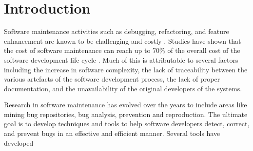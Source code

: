 
\setcounter{page}{1}

\chapter{Introduction}

Software maintenance activities such as debugging, refactoring, and feature enhancement are known to be challenging and costly \cite{Pressman2005}.
Studies have shown that the cost of software maintenance can reach up to 70\% of the overall cost of the software development life cycle \cite{HealthSocial2002}.
Much of this is attributable to several factors including the increase in software complexity, the lack of traceability between the various artefacts of the software development process, the lack of proper documentation,  and the unavailability of the original developers of the systems.

Research in software maintenance has evolved over the years to include areas like mining bug repositories, bug analysis, prevention and reproduction. The ultimate goal is to develop techniques and tools to help software developers detect, correct, and prevent bugs in an effective and efficient manner. Several tools have developed

